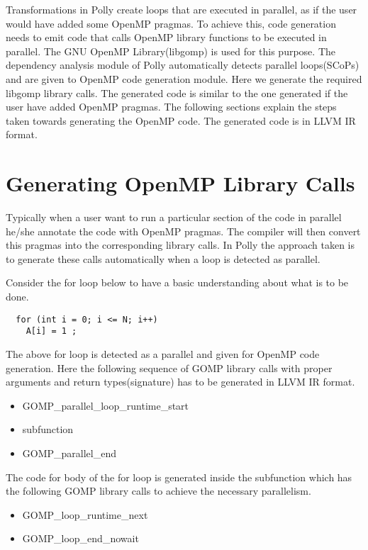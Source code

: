 \label{chap:openmp}

Transformations in Polly create loops that are executed in parallel, as if the user would have
added some OpenMP pragmas. To achieve this, code generation needs to emit code that calls OpenMP
library functions to be executed in parallel. The GNU OpenMP Library(libgomp) is used for this purpose. The
dependency analysis module of Polly automatically detects parallel loops(SCoPs) and are given to OpenMP
code generation module. Here we generate the required libgomp library calls. The generated code is similar
to the one generated if the user have added OpenMP pragmas\cite{parfor}. The following sections explain the steps
taken towards generating the OpenMP code. The generated code is in LLVM IR format.

\section{Generating OpenMP Library Calls}

Typically when a user want to run a particular section of the code in parallel he/she annotate the code with
OpenMP pragmas. The compiler will then convert this pragmas into the corresponding library calls. In Polly the
approach taken is to generate these calls automatically when a loop is detected as parallel.

Consider the for loop below to have a basic understanding about what is to be done.

\begin{lstlisting}
  for (int i = 0; i <= N; i++)
    A[i] = 1 ;
\end{lstlisting}

The above for loop is detected as a parallel and given for OpenMP code generation. Here the following
sequence of GOMP library calls with proper arguments and return types(signature) has to be generated in
LLVM IR format.

\begin{itemize}
\item GOMP\_parallel\_loop\_runtime\_start
\item subfunction
\item GOMP\_parallel\_end
\end{itemize}

The code for body of the for loop is generated inside the subfunction which has the following GOMP library
calls to achieve the necessary parallelism.

\begin{itemize}
\item GOMP\_loop\_runtime\_next
\item GOMP\_loop\_end\_nowait
\end{itemize}

